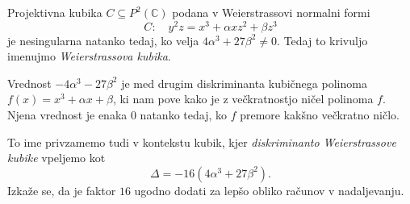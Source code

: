\documentclass[mat1]{fmfdelo}
\newcommand{\PC}{P^2(\mathbb C)}
\theoremstyle{definition}
\begin{document}
\begin{trditev}
    \label{kriterij za singularnost wnf}
    Projektivna kubika $C \subseteq \PC$ podana v Weierstrassovi normalni formi
    \[
        C: \quad y^2z = x^3 + \alpha xz^2 + \beta z^3
    \]
    je nesingularna natanko tedaj, ko velja $4\alpha^3 + 27\beta^2 \neq 0$. Tedaj to krivuljo imenujmo \emph{Weierstrassova kubika}. 

\end{trditev}

\begin{opomba}
    Vrednost $-4\alpha^3 - 27\beta^2$ je med drugim diskriminanta kubičnega polinoma $f(x) = x^3 + \alpha x + \beta$, ki nam pove kako je z večkratnostjo ničel polinoma $f$. Njena vrednost je enaka $0$ natanko tedaj, ko $f$ premore kakšno večkratno ničlo. 
    
    To ime privzamemo tudi v kontekstu kubik, kjer \emph{diskriminanto Weierstrassove kubike} vpeljemo kot
    \[
        \Delta = -16(4\alpha^3 + 27\beta^2).
    \]
    Izkaže se, da je faktor $16$ ugodno dodati za lepšo obliko računov v nadaljevanju. 

    

\end{opomba}
\end{document}
